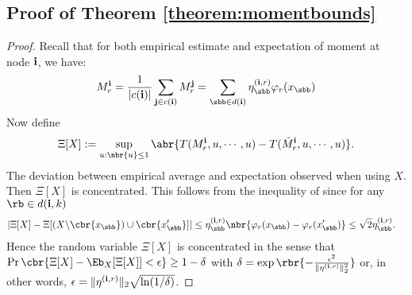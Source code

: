 \documentclass[twoside,11pt]{article}
\newcommand{\ib}{{\bf i}}
\newcommand{\jb}{{\bf j}}
\begin{document}
{%



\subsection{Proof of Theorem \ref{theorem:momentbounds}}
\label{proof:momentbounds}
\begin{proof}
  Recall that for both empirical estimate and expectation of moment at node $\ib$, we have:
  \begin{equation}
  \begin{aligned}
	M_r^{\ib} = \frac{1}{|c(\ib)|} \sum_{\jb \in c(\ib)}  M_r^\jb
	= \sum_{\sbb \in d(\ib)} \eta_\sbb^{(\ib,r)} \varphi_r(x_\sbb)  
  \end{aligned}
  \end{equation}
Now define
  \begin{align}
    \Xi[X] := \sup_{u: \nbr{u} \leq 1} \abr{T(M_r^{\ib}, u, \cdots, u) -T(\hat{M}_r^{\ib}, u, \cdots, u)}\nonumber.
  \end{align}
  The deviation between empirical average and expectation observed
  when using $X$. Then $\Xi[X]$ is concentrated. This follows from
  the inequality of \cite{McDiarmid89} since for any $\rb\in d(\ib,k)$
  \begin{equation}
  \begin{aligned}
    \label{eq:xi-difference}
     &|\Xi[X] - \Xi[(X \backslash \cbr{x_\sbb}) \cup \cbr{x'_\sbb}]| \leq  \eta_\sbb^{(\ib,r)} \nbr{\varphi_r(x_\sbb) - \varphi_r(x'_\sbb)}
    \leq \sqrt{2} \eta_\sbb^{(\ib,r)}.
  \end{aligned}
  \end{equation}
  Hence the random variable $\Xi[X]$ is concentrated in the sense that $\Pr\cbr{\Xi[X] - \Eb_{X}[\Xi[X]] < \epsilon} \geq 1-\delta$ with  $\delta = \exp\rbr{-\frac{\epsilon^2}{\|\eta^{(\ib,r)}\|_2^2}}$ or, in other words, $\epsilon = \|\eta^{(\ib,r)}\|_2 \sqrt{\ln (1/\delta)}$.


\end{proof}}
\end{document}
